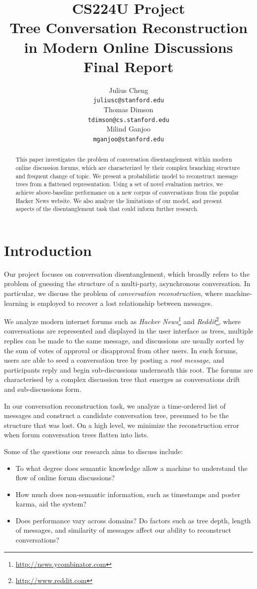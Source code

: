 \documentclass{article}
\title{{\small CS224U Project} \\ Tree Conversation Reconstruction in Modern Online Discussions \\ \small{Final Report}}
\author{Julius Cheng \\
  {\tt juliusc@stanford.edu}
  \\\And
  Thomas Dimson  \\
  {\tt tdimson@cs.stanford.edu}
  \\\AND
  Milind Ganjoo \\
  {\tt mganjoo@stanford.edu}
}
\date{}
\begin{document}
\maketitle
\begin{abstract}
This paper investigates the problem of conversation disentanglement within
modern online discussion forums, which are characterized by their complex
branching structure and frequent change of topic. We present a probabilistic
model to reconstruct message trees from a flattened representation. Using a
set of novel evaluation metrics, we achieve above-baseline performance on a
new corpus of conversations from the popular Hacker News website. We also
analyze the limitations of our model, and present aspects of the
disentanglement task that could inform further research.
\end{abstract}

\section{Introduction}
Our project focuses on conversation disentanglement, which broadly refers to
the problem of guessing the structure of a multi-party, asynchronous
conversation. In particular, we discuss the problem of \textit{conversation
reconstruction}, where machine-learning is employed to recover a lost
relationship between messages.

We analyze modern internet forums such as
\textit{Hacker News}\footnote{\url{http://news.ycombinator.com}} 
and \textit{Reddit}\footnote{\url{http://www.reddit.com}}, where conversations
are represented and displayed in the user interface as trees, multiple
replies can be made to the same message, and discussions are usually sorted by
the sum of votes of approval or disapproval from other users. In
such forums, users are able to seed a conversation tree by posting a
\textit{root message}, and participants reply and begin sub-discussions
underneath this root. The forums are characterised by a complex discussion
tree that emerges as conversations drift and sub-discussions form.

In our conversation reconstruction task, we analyze a time-ordered list of
messages and construct a candidate conversation tree, presumed to be the
structure that was lost. On a high level, we minimize the reconstruction error
when forum conversation trees flatten into lists.

Some of the questions our research aims to discuss include:
\begin{itemize}
  \item To what degree does semantic knowledge allow a machine to understand the 
    flow of online forum discussions?
  \item How much does non-semantic information, such as timestamps and poster karma,
    aid the system?
  \item Does performance vary across domains? Do factors such as tree depth,
    length of messages, and similarity of messages affect our ability to
    reconstruct conversations? 
\end{itemize}
\end{document}
